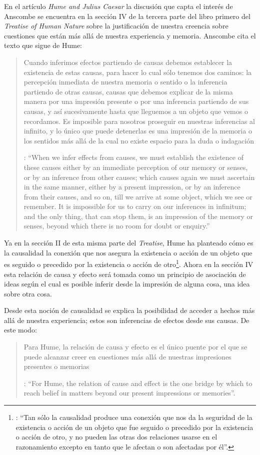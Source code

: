 En el artículo \emph{Hume and Julius Caesar} la discusión que capta el interés de Anscombe se encuentra en la sección IV de la tercera parte del libro primero del \emph{Treatise of Human Nature} sobre la justificación de nuestra creencia sobre cuestiones que están más allá de nuestra experiencia y memoria. Anscombe cita el texto que sigue de Hume: \blockquote[
{\Cite[75]{hume1740treatisees}}: \enquote{When we infer effects from causes, we must establish the existence of these causes \textelp{} either by an immediate perception of our memory or senses, or by an inference from other causes; which causes again we must ascertain in the same manner, either by a present impression, or by an inference from their causes, and so on, till we arrive at some object, which we see or remember. It is impossible for us to carry on our inferences in infinitum; and the only thing, that can stop them, is an impression of the memory or senses, beyond which there is no room for doubt or enquiry.}
]{Cuando inferimos efectos partiendo de causas debemos establecer la existencia de estas causas, para hacer lo cual sólo tenemos dos caminos: la percepción inmediata de nuestra memoria o sentido o la inferencia partiendo de otras causas, causas que debemos explicar de la misma manera por una impresión presente o por una inferencia partiendo de sus causas, y así sucesivamente hasta que lleguemos a un objeto que vemos o recordamos. Es imposible para nosotros proseguir en nuestras inferencias al infinito, y lo único que puede detenerlas es una impresión de la memoria o los sentidos más allá de la cual no existe espacio para la duda o indagación}.

Ya en la sección II de esta misma parte del \emph{Treatise}, Hume ha planteado cómo es la causalidad la conexión que nos asegura la existencia o acción de un objeto que es seguido o precedido por la existencia o acción de otro\footnote{\cite[Cf.][53]{hume1740treatisees}: \enquote{Tan sólo la causalidad produce una conexión que nos da la seguridad de la existencia o acción de un objeto que fue seguido o precedido por la existencia o acción de otro, y no pueden las otras dos relaciones usarse en el razonamiento excepto en tanto que le afectan o son afectadas por él}.}. Ahora en la sección IV esta relación de causa y efecto será tomada como un principio de asociación de ideas según el cual es posible inferir desde la impresión de alguna cosa, una idea sobre otra cosa.

Desde esta noción de causalidad se explica la posibilidad de acceder a hechos más allá de nuestra experiencia; estos son inferencias de efectos desde sus causas. De este modo: \blockquote[{\Cite[87]{anscombe1981parmenides:humeandjulius}}: \enquote{For Hume, the relation of cause and effect is the one bridge by which to reach belief in matters beyond our present impressions or memories}.]{Para Hume, la relación de causa y efecto es el único puente por el que se puede alcanzar creer en cuestiones más allá de nuestras impresiones presentes o memorias}.

